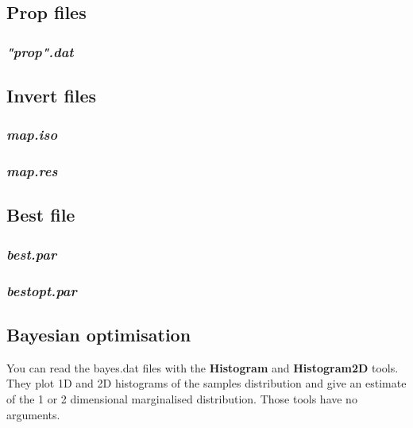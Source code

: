 \subsection{Prop files}

\subsubsection{\sl "prop".dat \ \ \ }

\subsection{Invert files}

\subsubsection{\sl map.iso \ \ \ }

\subsubsection{\sl map.res \ \ \ }

\subsection{Best file}

\subsubsection{\sl best.par \ \ \ }

\subsubsection{\sl bestopt.par \ \ \ }

\subsection{Bayesian optimisation}
You can read the bayes.dat files with the \textbf{Histogram} and \textbf{Histogram2D} tools. 
They plot 1D and 2D histograms of the samples distribution and give an estimate of the 1 or 2 dimensional marginalised distribution. Those tools have no arguments.


